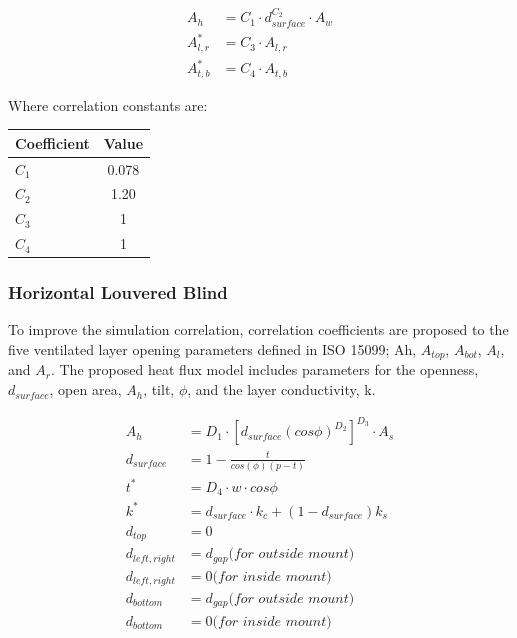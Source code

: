 \begin{equation}
\begin{array}{rl}
A_h & = C_1 \cdot d_{surface}^{C_2} \cdot A_w \\
A_{l,r}^* & = C_3 \cdot A_{l,r} \\
A_{t,b}^* & = C_4 \cdot A_{t,b}
\end{array}
\label{eq:ScreenCorrelations}
\end{equation}

Where correlation constants are:

\begin{tabular}{ l c }
	\hline	
	Coefficient & Value \\
	\hline
	\hline
	$C_1$ & 0.078 \\
	$C_2$ & 1.20 \\
	$C_3$ & 1 \\
	$C_4$ & 1 \\
	\hline  
	
\end{tabular}

\subsubsection{Horizontal Louvered Blind}
To improve the simulation correlation, correlation coefficients are proposed to the five ventilated layer opening parameters defined in ISO 15099; Ah, $A_{top}$, $A_{bot}$, $A_l$, and $A_r$. The proposed heat flux model includes parameters for the openness, $d_{surface}$, open area, $A_h$, tilt, $\phi$, and the layer conductivity, k.

\begin{equation}
\begin{array}{rl}
A_h & = D_1 \cdot [d_{surface} (cos\phi)^{D_2}]^{D_3} \cdot A_s \\
d_{surface} & = 1 - \frac{t}{cos(\phi)(p-t)} \\
t^* & = D_4 \cdot w \cdot cos\phi \\
k^* & = d_{surface} \cdot k_c + (1 - d_{surface})k_s \\
d_{top} & = 0 \\
d_{left, right} & = d_{gap} \textit{(for outside mount)} \\
d_{left, right} & = 0 \textit{(for inside mount)} \\
d_{bottom} & = d_{gap} \textit{(for outside mount)} \\
d_{bottom} & = 0 \textit{(for inside mount)} \\
\end{array}
\label{eq:VenetianCorrelations}
\end{equation}

